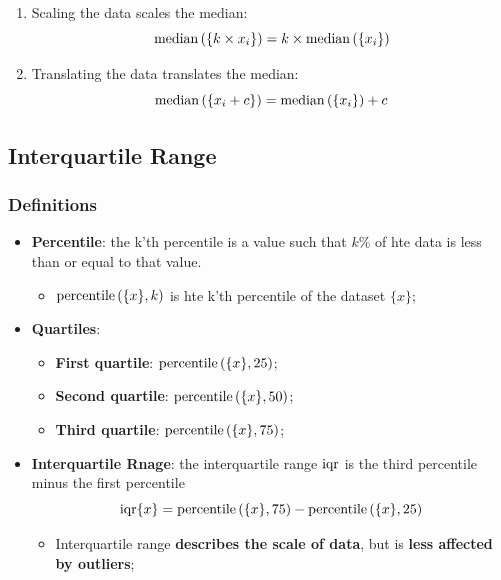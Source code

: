       \begin{enumerate}
        \item Scaling the data scales the median:
        \begin{equation}
          \operatorname{median} \left( \{ k \times x_{i} \} \right) = k \times \operatorname{median} \left( \{ x_{i} \} \right)
        \end{equation}

        \item Translating the data translates the median:
        \begin{equation}
          \operatorname{median} \left( \{ x_{i} + c \} \right) = \operatorname{median} \left( \{ x_{i} \} \right) + c
        \end{equation}
      \end{enumerate}
      
  \subsection{Interquartile Range}
  
    \subsubsection{Definitions}
    
      \begin{itemize}
        \item \textbf{Percentile}: the k'th percentile is a value such that $ k \% $ of hte data is less than or equal to that value.
        \begin{itemize}
          \item $ \operatorname{percentile}\left( \{ x \}, k \right) $ is hte k'th percentile of the dataset $ \{ x \} $;
        \end{itemize}
        
        \item \textbf{Quartiles}: 
        \begin{itemize}
          \item \textbf{First quartile}: $ \operatorname{percentile}\left( \{ x \}, 25 \right) $;
          \item \textbf{Second quartile}: $ \operatorname{percentile}\left( \{ x \}, 50 \right) $;
          \item \textbf{Third quartile}: $ \operatorname{percentile}\left( \{ x \}, 75 \right) $;
        \end{itemize}
        
        \item \textbf{Interquartile Rnage}: the interquartile range $ \operatorname{iqr} $ is the third percentile minus the first percentile
        \begin{equation}
          \operatorname{iqr}\{ x \} = \operatorname{percentile}\left( \{ x \}, 75 \right) - \operatorname{percentile}\left( \{ x \}, 25 \right)
        \end{equation}
        \begin{itemize}
          \item Interquartile range \textbf{describes the scale of data}, but is \textbf{less affected by outliers};
        \end{itemize}
      \end{itemize}
      
